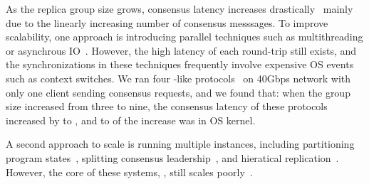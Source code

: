 
As the replica group size grows, \paxos consensus latency increases
drastically~\cite{scatter:sosp11} mainly due to the linearly
increasing number of consensus messsages. To improve scalability,
one approach is introducing parallel techniques such as multithreading or
asynchrous IO~\cite{zookeeper, crane:sosp15}. However, the high latency of each
round-trip still exists, and the synchronizations in these techniques
frequently involve expensive OS events such as context switches. We ran four
\paxos-like protocols~\cite{zookeeper, crane:sosp15, spaxos, libpaxos} on 40Gbps
network with only one client sending consensus requests, and we found that: when
the group size increased from three to nine, the consensus latency of these
protocols increased by \tradlatencyincreaselow to \tradlatencyincreasehigh, and
\systemcostlow to \systemcosthigh of the increase was in OS kernel.

A second approach to scale \paxos is running multiple \paxos instances,
including partitioning program states~\cite{scatter:sosp11,dssmr,ssmr},
splitting consensus leadership~\cite{mencius:osdi08,spaxos}, and hieratical
replication~\cite{manos:hotdep10,scatter:sosp11}. However, the core of
these systems, \paxos, still
scales poorly~\cite{ellis:thesis,scatter:sosp11,manos:hotdep10}.





